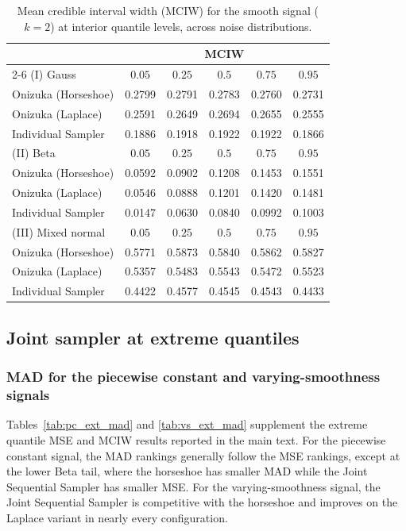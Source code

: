 \begin{table}[htbp]
\centering
\caption{Mean credible interval width (MCIW) for the smooth signal ($k=2$) at interior quantile levels, across noise distributions.}
\label{tab:s_int_mciw}
\begin{tabular}{lccccc}
\toprule
& \multicolumn{5}{c}{MCIW} \\
\cmidrule(lr){2-6}
(I) Gauss & $0.05$ & $0.25$ & $0.5$ & $0.75$ & $0.95$ \\
\midrule
Onizuka (Horseshoe) & 0.2799 & 0.2791 & 0.2783 & 0.2760 & 0.2731 \\
Onizuka (Laplace)   & 0.2591 & 0.2649 & 0.2694 & 0.2655 & 0.2555 \\
Individual Sampler  & 0.1886 & 0.1918 & 0.1922 & 0.1922 & 0.1866 \\
\midrule
(II) Beta & $0.05$ & $0.25$ & $0.5$ & $0.75$ & $0.95$ \\
\midrule
Onizuka (Horseshoe) & 0.0592 & 0.0902 & 0.1208 & 0.1453 & 0.1551 \\
Onizuka (Laplace)   & 0.0546 & 0.0888 & 0.1201 & 0.1420 & 0.1481 \\
Individual Sampler  & 0.0147 & 0.0630 & 0.0840 & 0.0992 & 0.1003 \\
\midrule
(III) Mixed normal & $0.05$ & $0.25$ & $0.5$ & $0.75$ & $0.95$ \\
\midrule
Onizuka (Horseshoe) & 0.5771 & 0.5873 & 0.5840 & 0.5862 & 0.5827 \\
Onizuka (Laplace)   & 0.5357 & 0.5483 & 0.5543 & 0.5472 & 0.5523 \\
Individual Sampler  & 0.4422 & 0.4577 & 0.4545 & 0.4543 & 0.4433 \\
\bottomrule
\end{tabular}
\end{table}

\clearpage
\subsection{Joint sampler at extreme quantiles}
\label{app:sim:joint}

\subsubsection{MAD for the piecewise constant and varying-smoothness signals}

Tables~\ref{tab:pc_ext_mad} and \ref{tab:vs_ext_mad} supplement the extreme quantile MSE and MCIW results reported in the main text. For the piecewise constant signal, the MAD rankings generally follow the MSE rankings, except at the lower Beta tail, where the horseshoe has smaller MAD while the Joint Sequential Sampler has smaller MSE. For the varying-smoothness signal, the Joint Sequential Sampler is competitive with the horseshoe and improves on the Laplace variant in nearly every configuration.

